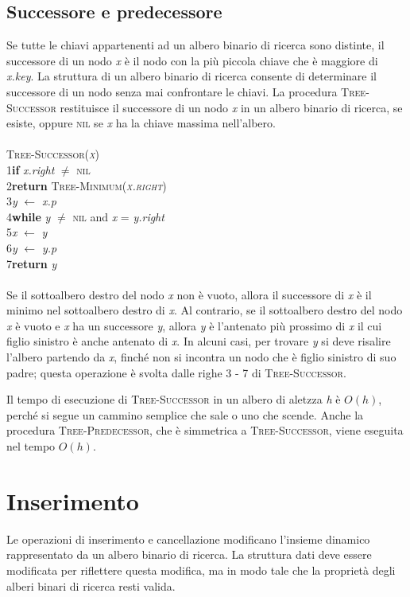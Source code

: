 \documentclass[10pt, a4paper]{report}
\newcommand\firsttab[1][0.5cm]{\hspace*{#1}}
\newcommand\secondtab[1][1cm]{\hspace*{#1}}
\begin{document}
\subsection{Successore e predecessore}
Se tutte le chiavi appartenenti ad un albero binario di ricerca sono distinte, il successore di un nodo \textit{x} è il nodo con la più piccola chiave che è maggiore di \textit{x.key}. La struttura di un albero binario di ricerca consente di determinare il successore di un nodo senza mai confrontare le chiavi. La procedura \textsc{Tree-Successor} restituisce il successore di un nodo \textit{x} in un albero binario di ricerca, se esiste, oppure \textsc{nil} se \textit{x} ha la chiave massima nell'albero.\\\\
\textsc{Tree-Successor(\textit{x})}\\
1\firsttab\textbf{if} \textit{x.right} $\not=$ \textsc{nil}\\
2\secondtab\textbf{return} \textsc{Tree-Minimum(\textit{x.right})}\\
3\firsttab\textit{y} $\leftarrow$ \textit{x.p}\\
4\firsttab\textbf{while} \textit{y} $\not=$ \textsc{nil} and \textit{x} = \textit{y.right}\\
5\secondtab\textit{x} $\leftarrow$ \textit{y}\\
6\secondtab\textit{y} $\leftarrow$ \textit{y.p}\\
7\firsttab\textbf{return} \textit{y}\\\\
Se il sottoalbero destro del nodo \textit{x} non è vuoto, allora il successore di \textit{x} è il minimo nel sottoalbero destro di \textit{x}. Al contrario, se il sottoalbero destro del nodo \textit{x} è vuoto e \textit{x} ha un successore \textit{y}, allora \textit{y} è l'antenato più prossimo di \textit{x} il cui figlio sinistro è anche antenato di \textit{x}. In alcuni casi, per trovare \textit{y} si deve risalire l'albero partendo da \textit{x}, finché non si incontra un nodo che è figlio sinistro di suo padre; questa operazione è svolta dalle righe 3 - 7 di \textsc{Tree-Successor}.

Il tempo di esecuzione di \textsc{Tree-Successor} in un albero di aletzza \textit{h} è $O(h)$, perché si segue un cammino semplice che sale o uno che scende. Anche la procedura \textsc{Tree-Predecessor}, che è simmetrica a \textsc{Tree-Successor}, viene eseguita nel tempo $O(h)$.
\section{Inserimento}
Le operazioni di inserimento e cancellazione modificano l'insieme dinamico rappresentato da un albero binario di ricerca. La struttura dati deve essere modificata per riflettere questa modifica, ma in modo tale che la proprietà degli alberi binari di ricerca resti valida.
\end{document}
